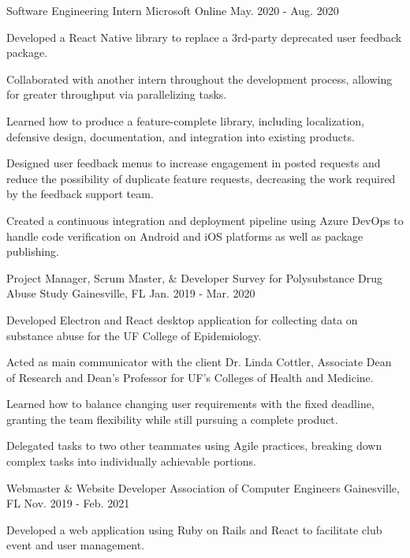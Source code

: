 \begin{cventries}
  \cventry
    {Software Engineering Intern}
    {Microsoft}
    {Online}
    {May. 2020 - Aug. 2020}
    {
      \begin{cvitems}
        \item{Developed a React Native library to replace a 3rd-party deprecated user feedback package.}
        \item{Collaborated with another intern throughout the development process, allowing for greater throughput via parallelizing tasks.}
        \item{Learned how to produce a feature-complete library, including localization, defensive design, documentation, and integration into existing products.}
        \item{Designed user feedback menus to increase engagement in posted requests and reduce the possibility of duplicate feature requests, decreasing the work required by the feedback support team.}
        \item{Created a continuous integration and deployment pipeline using Azure DevOps to handle code verification on Android and iOS platforms as well as package publishing.}
      \end{cvitems}
    }
  \cventry
    {Project Manager, Scrum Master, \& Developer}
    {Survey for Polysubstance Drug Abuse Study}
    {Gainesville, FL}
    {Jan. 2019 - Mar. 2020}
    {
      \begin{cvitems}
        \item {Developed Electron and React desktop application for collecting data on substance abuse for the UF College of Epidemiology.}
        \item {Acted as main communicator with the client Dr. Linda Cottler, Associate Dean of Research and Dean's Professor for UF's Colleges of Health and Medicine.}
        \item {Learned how to balance changing user requirements with the fixed deadline, granting the team flexibility while still pursuing a complete product.}
        \item {Delegated tasks to two other teammates using Agile practices, breaking down complex tasks into individually achievable portions.}
      \end{cvitems}
    }
  \cventry
    {Webmaster \& Website Developer}
    {Association of Computer Engineers}
    {Gainesville, FL}
    {Nov. 2019 - Feb. 2021}
    {
      \begin{cvitems}
        \item {Developed a web application using Ruby on Rails and React to facilitate club event and user management.}

\end{cvitems}}
\end{cventries}
